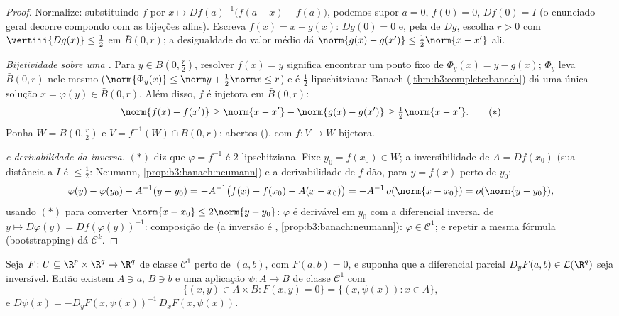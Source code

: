 \begin{proof}
Normalize: substituindo $f$ por $x \mapsto Df(a)^{-1}\bigl(f(a +
x) - f(a)\bigr)$, podemos supor $a = 0$, $f(0) = 0$,
$Df(0) =
I$ (o enunciado geral decorre compondo com as bijeções afins).
Escreva $f(x) = x + g(x)$: $Dg(0) = 0$ e, pela  de $Dg$, escolha $r > 0$
com $\vertiii{Dg(x)} \leq \frac12$ em $\bar B(0, r)$; a desigualdade do valor médio dá $\norm{g(x) - g(x')} \leq \frac12
\norm{x - x'}$ ali.

\emph{Bijetividade sobre uma .} Para $y \in B(0,
\frac r2)$, resolver $f(x) = y$
significa encontrar um ponto fixo de $\Phi_y(x) = y - g(x)$; $\Phi_y$ leva $\bar B(0, r)$ nele
mesmo ($\norm{\Phi_y(x)} \leq \norm y + \frac12\norm x \leq
r$) e é $\frac12$-lipschitziana: Banach (\cref{thm:b3:complete:banach}) dá uma única
solução $x = \varphi(y) \in \bar B(0,r)$. Além disso, $f$ é injetora em $\bar B(0,r)$:
\[
\norm{f(x) - f(x')} \geq \norm{x - x'} - \norm{g(x) - g(x')}
\geq \tfrac12\norm{x - x'} .
\tag{$*$}
\]
Ponha $W = B(0, \frac r2)$ e $V = f^{-1}(W)\cap B(0, r)$: abertos (), com $f \colon V \to W$ bijetora.

\emph{ e derivabilidade da inversa.} $(*)$ diz que $\varphi = f^{-1}$ é
$2$-lipschitziana. Fixe $y_0 = f(x_0)
\in W$; a inversibilidade de $A = Df(x_0)$ (sua distância
a $I$ é $\leq \frac12$: Neumann, \cref{prop:b3:banach:neumann}) e a derivabilidade de $f$
dão, para $y = f(x)$ perto de $y_0$:
\[
\varphi(y) - \varphi(y_0) - A^{-1}(y - y_0)
= -A^{-1}\bigl(f(x) - f(x_0) - A(x - x_0)\bigr)
= -A^{-1}\,o(\norm{x - x_0}) = o(\norm{y - y_0}),
\]
usando $(*)$ para converter $\norm{x - x_0} \leq 2\norm{y - y_0}$: $\varphi$ é derivável em $y_0$ com a
diferencial inversa.  de $y \mapsto D\varphi(y) =
Df(\varphi(y))^{-1}$: composição de  (a inversão é , \cref{prop:b3:banach:neumann}): $\varphi \in \mathcal C^1$; e repetir a
mesma fórmula (bootstrapping) dá $\mathcal C^k$.
\end{proof}

\begin{theorem}
\label{thm:b3:submanifolds:implicit}
Seja $F \colon U \subseteq \R^p\times\R^q \to \R^q$ de classe $\mathcal C^1$ perto de $(a, b)$, com $F(a,b) = 0$, e suponha que a
diferencial parcial $D_yF(a,b) \in \mathcal L(\R^q)$ seja inversível. Então existem 
$A \ni a$, $B \ni b$ e uma aplicação $\psi \colon A \to B$ de classe $\mathcal C^1$ com
\[
\bigl\{(x, y)\in A\times B : F(x,y) = 0\bigr\}
= \{(x, \psi(x)) : x \in A\},
\]
e $D\psi(x) = -D_yF(x, \psi(x))^{-1}\,D_xF(x,
\psi(x))$.
\end{theorem}

